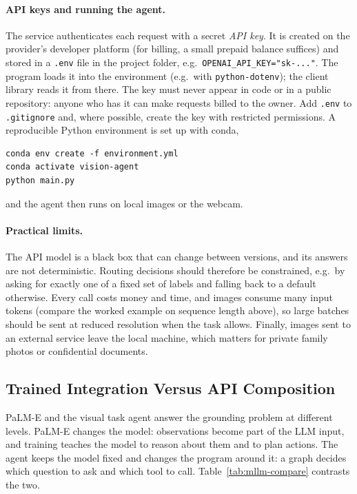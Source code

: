 \paragraph{API keys and running the agent.}
The service authenticates each request with a secret \emph{API key}. It is
created on the provider's developer platform (for billing, a small prepaid
balance suffices) and stored in a \texttt{.env} file in the project folder,
e.g.\ \texttt{OPENAI\_API\_KEY="sk-..."}. The program loads it into the
environment (e.g.\ with \texttt{python-dotenv}); the client library reads it
from there. The key must never appear in code or in a public repository:
anyone who has it can make requests billed to the owner. Add \texttt{.env} to
\texttt{.gitignore} and, where possible, create the key with restricted
permissions. A reproducible Python environment is set up with conda,
\begin{small}
\begin{verbatim}
conda env create -f environment.yml
conda activate vision-agent
python main.py
\end{verbatim}
\end{small}
\noindent
and the agent then runs on local images or the webcam.

\paragraph{Practical limits.}
The API model is a black box that can change between versions, and its
answers are not deterministic. Routing decisions should therefore be
constrained, e.g.\ by asking for exactly one of a fixed set of labels and
falling back to a default otherwise. Every call costs money and time, and
images consume many input tokens (compare the worked example on sequence
length above), so large batches should be sent at reduced resolution when
the task allows. Finally, images sent to an external service leave the local
machine, which matters for private family photos or confidential documents.

\subsection{Trained Integration Versus API Composition}

PaLM-E and the visual task agent answer the grounding problem at different
levels. PaLM-E changes the model: observations become part of the LLM input,
and training teaches the model to reason about them and to plan actions. The
agent keeps the model fixed and changes the program around it: a graph
decides which question to ask and which tool to call.
Table~\ref{tab:mllm-compare} contrasts the two.

